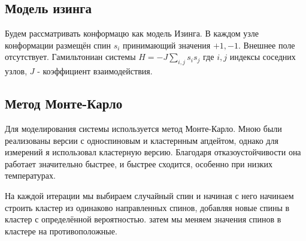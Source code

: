 \subsection{Модель изинга}
Будем рассматривать конформацю как модель Изинга. В каждом узле конформации размещён спин $s_i$ принимающий значения $+1, -1$. Внешнее поле отсутствует. Гамильтониан системы $H = -J\sum_{i, j} s_i s_j$ где $i, j$ индексы соседних узлов, $J$ - коэффициент взаимодействия.

\subsection{Метод Монте-Карло}
Для моделирования системы используется метод Монте-Карло. Мною были реализованы версии с односпиновым и кластернным апдейтом, однако для измерений я использовал кластерную версию. Благодаря отказоустойчивости она работает значительно быстрее, и быстрее сходится, особенно при низких температурах.

На каждой итерации мы выбираем случайный спин и начиная с него начинаем строить кластер из одинаково направленных спинов, добавляя новые спины в кластер с определённой вероятностью. затем мы меняем значения спинов в кластере на противоположные.